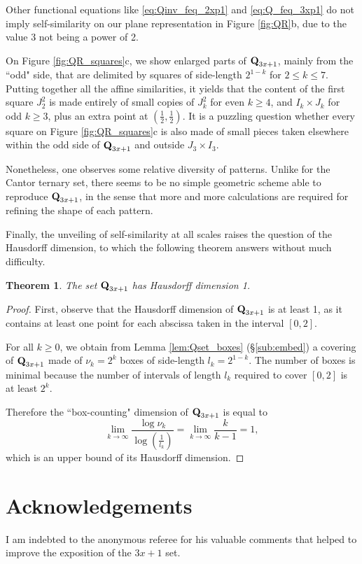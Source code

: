 \documentclass[12pt]{article}
\newtheorem{theorem}{Theorem}
\theoremstyle{definition}
\newcommand{\Qset}{\normalfont \textbf{Q}_{3x+1}}
\begin{document}
{{Other functional equations like \eqref{eq:Qinv_feq_2xp1} and \eqref{eq:Q_feq_3xp1} do not imply self-similarity on our plane representation in Figure \ref{fig:QR}b, due to the value 3 not being a power of 2.

On Figure \ref{fig:QR_squares}c, we show enlarged parts of $\Qset$, mainly from the ``odd" side, that are delimited by squares of side-length $2^{1-k}$ for $2\leq k \leq 7$. Putting together all the affine similarities, it yields that the content of the first square $J_{2}^{2}$ is made entirely of small copies of $J_{k}^{2}$ for even $k \geq 4$, and  $I_{k} \times J_{k}$ for odd $k \geq 3$, plus an extra point at $\left( \frac{1}{2}, \frac{1}{2}  \right) $. It is a puzzling question whether every square on Figure \ref{fig:QR_squares}c is also made of small pieces taken elsewhere within the odd side of $\Qset$ and outside $J_{3} \times I_{3}$.

Nonetheless, one observes some relative diversity of patterns. Unlike for the Cantor ternary set, there seems to be no simple geometric scheme able to reproduce $\Qset$, in the sense that more and more calculations are required for refining the shape of each pattern.

Finally, the unveiling of self-similarity at all scales raises the question of the Hausdorff dimension, to which the following theorem answers without much difficulty.

\begin{theorem}
The set $\Qset$ has Hausdorff dimension 1.
\end{theorem}

\begin{proof}
First, observe that the Hausdorff dimension of $\Qset$ is at least 1, as it contains at least one point for each abscissa taken in the interval $[0,2]$.

For all $k \geq 0$, we obtain from Lemma \ref{lem:Qset_boxes} (\S\ref{sub:embed}) a covering of $\Qset$ made of $\nu_k = 2^k$ boxes of side-length $l_k = 2^{1-k}$. The number of boxes is minimal because the number of intervals of length $l_k$ required to cover $[0,2]$ is at least $2^k$.

Therefore the ``box-counting" dimension of $\Qset$ is equal to
$$\lim_{k \rightarrow \infty}  \frac{\log \nu_k}{\log\left( \frac{1}{l_k}\right) } = \lim_{k \rightarrow \infty}  \frac{k}{k-1} = 1,$$
which is an upper bound of its Hausdorff dimension. 
\end{proof}

\section*{Acknowledgements}
I am indebted to the anonymous referee for his valuable comments that helped to improve the exposition of the $3x+1$ set.

}}
\end{document}
